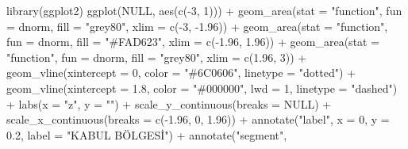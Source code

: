 \documentclass[
  12pt,
]{book}
\newenvironment{Shaded}{\begin{snugshade}}{\end{snugshade}}
\newcommand{\AttributeTok}[1]{\textcolor[rgb]{0.77,0.63,0.00}{#1}}
\newcommand{\ConstantTok}[1]{\textcolor[rgb]{0.00,0.00,0.00}{#1}}
\newcommand{\DecValTok}[1]{\textcolor[rgb]{0.00,0.00,0.81}{#1}}
\newcommand{\FloatTok}[1]{\textcolor[rgb]{0.00,0.00,0.81}{#1}}
\newcommand{\FunctionTok}[1]{\textcolor[rgb]{0.00,0.00,0.00}{#1}}
\newcommand{\NormalTok}[1]{#1}
\newcommand{\SpecialCharTok}[1]{\textcolor[rgb]{0.00,0.00,0.00}{#1}}
\newcommand{\StringTok}[1]{\textcolor[rgb]{0.31,0.60,0.02}{#1}}
\begin{document}
\begin{Shaded}
\begin{Highlighting}[]
\FunctionTok{library}\NormalTok{(ggplot2)}
\FunctionTok{ggplot}\NormalTok{(}\ConstantTok{NULL}\NormalTok{, }\FunctionTok{aes}\NormalTok{(}\FunctionTok{c}\NormalTok{(}\SpecialCharTok{{-}}\DecValTok{3}\NormalTok{, }\DecValTok{1}\NormalTok{))) }\SpecialCharTok{+} \FunctionTok{geom\_area}\NormalTok{(}\AttributeTok{stat =} \StringTok{"function"}\NormalTok{, }\AttributeTok{fun =}\NormalTok{ dnorm, }\AttributeTok{fill =} \StringTok{"grey80"}\NormalTok{, }
    \AttributeTok{xlim =} \FunctionTok{c}\NormalTok{(}\SpecialCharTok{{-}}\DecValTok{3}\NormalTok{, }\SpecialCharTok{{-}}\FloatTok{1.96}\NormalTok{)) }\SpecialCharTok{+} \FunctionTok{geom\_area}\NormalTok{(}\AttributeTok{stat =} \StringTok{"function"}\NormalTok{, }\AttributeTok{fun =}\NormalTok{ dnorm, }\AttributeTok{fill =} \StringTok{"\#FAD623"}\NormalTok{, }
    \AttributeTok{xlim =} \FunctionTok{c}\NormalTok{(}\SpecialCharTok{{-}}\FloatTok{1.96}\NormalTok{, }\FloatTok{1.96}\NormalTok{)) }\SpecialCharTok{+} \FunctionTok{geom\_area}\NormalTok{(}\AttributeTok{stat =} \StringTok{"function"}\NormalTok{, }\AttributeTok{fun =}\NormalTok{ dnorm, }\AttributeTok{fill =} \StringTok{"grey80"}\NormalTok{, }
    \AttributeTok{xlim =} \FunctionTok{c}\NormalTok{(}\FloatTok{1.96}\NormalTok{, }\DecValTok{3}\NormalTok{)) }\SpecialCharTok{+} \FunctionTok{geom\_vline}\NormalTok{(}\AttributeTok{xintercept =} \DecValTok{0}\NormalTok{, }\AttributeTok{color =} \StringTok{"\#6C0606"}\NormalTok{, }\AttributeTok{linetype =} \StringTok{"dotted"}\NormalTok{) }\SpecialCharTok{+} 
    \FunctionTok{geom\_vline}\NormalTok{(}\AttributeTok{xintercept =} \FloatTok{1.8}\NormalTok{, }\AttributeTok{color =} \StringTok{"\#000000"}\NormalTok{, }\AttributeTok{lwd =} \DecValTok{1}\NormalTok{, }\AttributeTok{linetype =} \StringTok{"dashed"}\NormalTok{) }\SpecialCharTok{+} 
    \FunctionTok{labs}\NormalTok{(}\AttributeTok{x =} \StringTok{"z"}\NormalTok{, }\AttributeTok{y =} \StringTok{""}\NormalTok{) }\SpecialCharTok{+} \FunctionTok{scale\_y\_continuous}\NormalTok{(}\AttributeTok{breaks =} \ConstantTok{NULL}\NormalTok{) }\SpecialCharTok{+} \FunctionTok{scale\_x\_continuous}\NormalTok{(}\AttributeTok{breaks =} \FunctionTok{c}\NormalTok{(}\SpecialCharTok{{-}}\FloatTok{1.96}\NormalTok{, }
    \DecValTok{0}\NormalTok{, }\FloatTok{1.96}\NormalTok{)) }\SpecialCharTok{+} \FunctionTok{annotate}\NormalTok{(}\StringTok{"label"}\NormalTok{, }\AttributeTok{x =} \DecValTok{0}\NormalTok{, }\AttributeTok{y =} \FloatTok{0.2}\NormalTok{, }\AttributeTok{label =} \StringTok{"KABUL BÖLGESİ"}\NormalTok{) }\SpecialCharTok{+} \FunctionTok{annotate}\NormalTok{(}\StringTok{"segment"}\NormalTok{, }

\end{Highlighting}
\end{Shaded}
\end{document}
